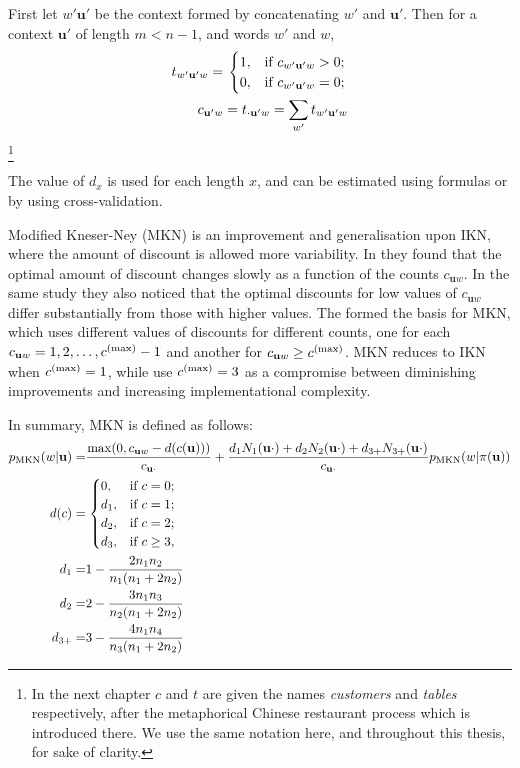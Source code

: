 First let $w'\mathbf{u'}$ be the context formed by concatenating $w'$ and $\mathbf{u'}$. Then for a context $\mathbf{u'}$ of length $m<n-1$, and words $w'$ and $w$,
\begin{equation}
\begin{split}
t_{w'\mathbf{u'}w} = \left.
\begin{cases}
1, & \textnormal{if } c_{w'\mathbf{u'}w} > 0; \\
0, & \textnormal{if } c_{w'\mathbf{u'}w} = 0;
\end{cases}
\right. \\
c_{\mathbf{u'}w} = t_{\cdot\mathbf{u'}w} = \sum_{w'}t_{w'\mathbf{u'}w}
\end{split}
\end{equation}\footnote{In the next chapter $c$ and $t$ are given the names \emph{customers} and \emph{tables} respectively, after the metaphorical Chinese restaurant process which is introduced there. We use the same notation here, and throughout this thesis, for sake of clarity.}

The value of $d_x$ is used for each length $x$, and can be estimated using formulas or by using cross-validation.

Modified Kneser-Ney (MKN) is an improvement and generalisation upon IKN, where the amount of discount is allowed more variability. In \cite{} they found that the optimal amount of discount changes slowly as a function of the counts $c_{\mathbf{u}w}$. In the same study they also noticed that the optimal discounts for low values of $c_{\mathbf{u}w}$ differ substantially from those with higher values. The formed the basis for MKN, which uses different values of discounts for different counts, one for each $c_{\mathbf{u}w} = 1, 2, \ldots, c^{(\textnormal{max})}-1$ and another for $c_{\mathbf{u}w} \geq c^{(\textnormal{max})}$. MKN reduces to IKN when $c^{(\textnormal{max})} = 1$, while \cite{} use $c^{(\textnormal{max})} = 3$ as a compromise between diminishing improvements and increasing implementational complexity.

In summary, MKN is defined as follows:
\begin{equation}\begin{split}
p_{\operatorname{MKN}}(w|\mathbf{u}) =& \frac{\max(0, c_{\mathbf{u}w} - d(c(\mathbf{u})))}{c_{\mathbf{u}\cdot}} + \frac{d_1N_1(\mathbf{u}\cdot) + d_2N_2(\mathbf{u}\cdot) + d_{3+}N_{3+}(\mathbf{u}\cdot)}{c_{\mathbf{u}\cdot}}p_{\operatorname{MKN}}(w|\pi(\mathbf{u})) \\
d(c) =& \left.
\begin{cases}
0, & \textnormal{if }c = 0; \\
d_1, & \textnormal{if } c = 1; \\
d_2, & \textnormal{if } c = 2; \\
d_3, & \textnormal{if } c \geq 3,
\end{cases}\right. \\
d_1 =& 1- \frac{2n_1n_2}{n_1(n_1+2n_2)} \\
d_2 =& 2 - \frac{3n_1n_3}{n_2(n_1+2n_2)} \\
d_{3+} =& 3 - \frac{4n_1n_4}{n_3(n_1+2n_2)}
\end{split}\end{equation}

